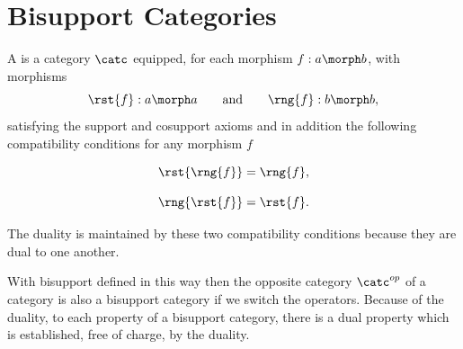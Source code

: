 \section{Bisupport Categories}

\begin{definition}
A  is a category $\catc$ equipped, for each
morphism $f:a\morph b$, with morphisms
\[
\rst{f}:a\morph a
\qquad\text{and}\qquad
\rng{f}:b\morph b,
\]
satisfying the support and cosupport axioms and in addition the following compatibility  conditions for any morphism $f$

\noindent [SC (i)]
\[
\rst{\rng{f}}=\rng{f},
\]

\noindent [SC (ii)]
\[
\rng{\rst{f}}=\rst{f}.
\]

The duality is maintained by these two compatibility conditions because they are dual to one another.
\end{definition}

With bisupport defined in this way then the opposite category $\catc^{op}$
of a category \catcw is also a bisupport category if we switch the operators. Because of the duality, to each property of a bisupport category, there is a dual property which is established, free of charge, by the duality. 


